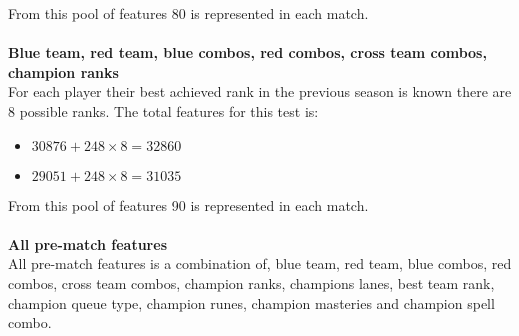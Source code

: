 From this pool of features 80 is represented in each match.\\\\
\textbf{Blue team, red team, blue combos, red combos, cross team combos, champion ranks}\\
For each player their best achieved rank in the previous season is known there are 8 possible ranks. The total features for this test is: 
\begin{itemize}
\item $30876 + 248\times8 = 32860$
\item $29051 + 248\times8 = 31035$
\end{itemize}
From this pool of features 90 is represented in each match. \\\\
\textbf{All pre-match features}\\
All pre-match features is a combination of, blue team, red team, blue combos, red combos, cross team combos, champion ranks, champions lanes, best team rank, champion queue type, champion runes, champion masteries and champion spell combo.  

